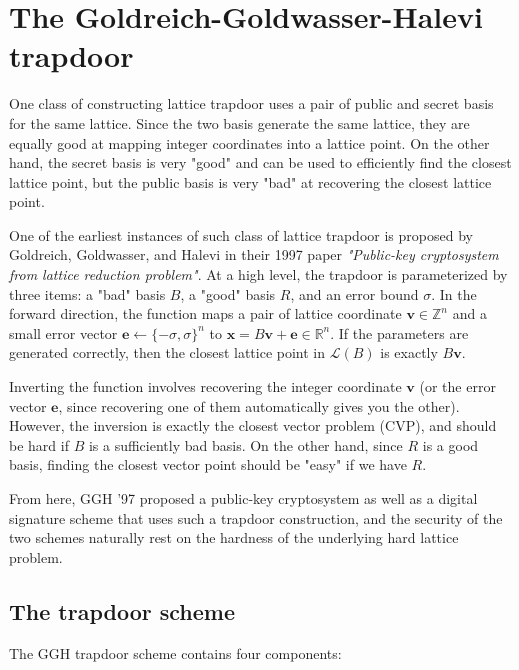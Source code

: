 \section{The Goldreich-Goldwasser-Halevi trapdoor}

One class of constructing lattice trapdoor uses a pair of public and secret basis for the same lattice. Since the two basis generate the same lattice, they are equally good at mapping integer coordinates into a lattice point. On the other hand, the secret basis is very "good" and can be used to efficiently find the closest lattice point, but the public basis is very "bad" at recovering the closest lattice point.

One of the earliest instances of such class of lattice trapdoor is proposed by Goldreich, Goldwasser, and Halevi in their 1997 paper \textit{"Public-key cryptosystem from lattice reduction problem"}\cite{goldreich1997public}. At a high level, the trapdoor is parameterized by three items: a "bad" basis $B$, a "good" basis $R$, and an error bound $\sigma$. In the forward direction, the function maps a pair of lattice coordinate $\mathbf{v} \in \mathbb{Z}^n$ and a small error vector $\mathbf{e} \leftarrow \{ -\sigma, \sigma \}^n$ to $\mathbf{x} = B\mathbf{v} + \mathbf{e} \in \mathbb{R}^n$. If the parameters are generated correctly, then the closest lattice point in $\mathcal{L}(B)$ is exactly $B\mathbf{v}$.

Inverting the function involves recovering the integer coordinate $\mathbf{v}$ (or the error vector $\mathbf{e}$, since recovering one of them automatically gives you the other). However, the inversion is exactly the closest vector problem (CVP), and should be hard if $B$ is a sufficiently bad basis. On the other hand, since $R$ is a good basis, finding the closest vector point should be "easy" if we have $R$.

From here, GGH '97 proposed a public-key cryptosystem as well as a digital signature scheme that uses such a trapdoor construction, and the security of the two schemes naturally rest on the hardness of the underlying hard lattice problem.

\subsection{The trapdoor scheme}
The GGH trapdoor scheme contains four components:


